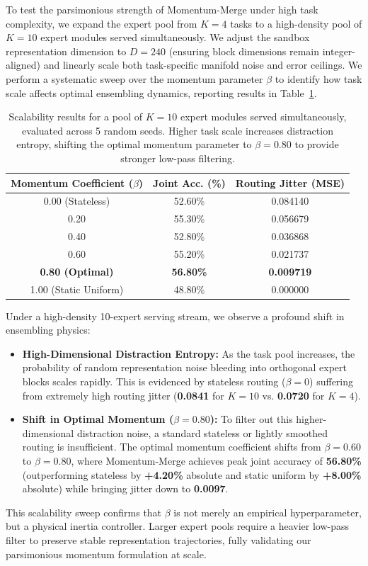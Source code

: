 \documentclass{article}
\theoremstyle{plain}
\theoremstyle{definition}
\theoremstyle{remark}
\begin{document}
    To test the parsimonious strength of Momentum-Merge under high task complexity, we expand the expert pool from $K = 4$ tasks to a high-density pool of $K = 10$ expert modules served simultaneously. We adjust the sandbox representation dimension to $D = 240$ (ensuring block dimensions remain integer-aligned) and linearly scale both task-specific manifold noise and error ceilings. We perform a systematic sweep over the momentum parameter $\beta$ to identify how task scale affects optimal ensembling dynamics, reporting results in Table~\ref{tab:scale_results}.

    \begin{table}[h]
    \centering
    \caption{Scalability results for a pool of $K=10$ expert modules served simultaneously, evaluated across 5 random seeds. Higher task scale increases distraction entropy, shifting the optimal momentum parameter to $\beta = 0.80$ to provide stronger low-pass filtering.}
    \label{tab:scale_results}
    \vskip 0.1in
    \begin{tabular}{ccc}
    \toprule
    \textbf{Momentum Coefficient} ($\beta$) & \textbf{Joint Acc. (\%)} & \textbf{Routing Jitter (MSE)} \\
    \midrule
    0.00 (Stateless) & 52.60\% & 0.084140 \\
    0.20 & 55.30\% & 0.056679 \\
    0.40 & 52.80\% & 0.036868 \\
    0.60 & 55.20\% & 0.021737 \\
    \textbf{0.80 (Optimal)} & \textbf{56.80\%} & \textbf{0.009719} \\
    1.00 (Static Uniform) & 48.80\% & 0.000000 \\
    \bottomrule
    \end{tabular}
    \end{table}

    Under a high-density 10-expert serving stream, we observe a profound shift in ensembling physics:
    \begin{itemize}
        \item \textbf{High-Dimensional Distraction Entropy:} As the task pool increases, the probability of random representation noise bleeding into orthogonal expert blocks scales rapidly. This is evidenced by stateless routing ($\beta=0$) suffering from extremely high routing jitter (\textbf{0.0841} for $K=10$ vs. \textbf{0.0720} for $K=4$).
        \item \textbf{Shift in Optimal Momentum ($\beta = 0.80$):} To filter out this higher-dimensional distraction noise, a standard stateless or lightly smoothed routing is insufficient. The optimal momentum coefficient shifts from $\beta = 0.60$ to \textbf{$\beta = 0.80$}, where Momentum-Merge achieves peak joint accuracy of \textbf{56.80\%} (outperforming stateless by \textbf{+4.20\%} absolute and static uniform by \textbf{+8.00\%} absolute) while bringing jitter down to \textbf{0.0097}.
    \end{itemize}
    This scalability sweep confirms that $\beta$ is not merely an empirical hyperparameter, but a physical inertia controller. Larger expert pools require a heavier low-pass filter to preserve stable representation trajectories, fully validating our parsimonious momentum formulation at scale.

\end{document}
